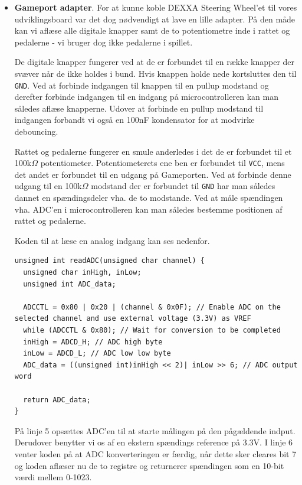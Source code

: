 \begin{itemize}
\item \textbf{Gameport adapter}. For at kunne koble DEXXA Steering Wheel'et til vores udviklingsboard var det dog nødvendigt at lave en lille adapter. På den måde kan vi aflæse alle digitale knapper samt de to potentiometre inde i rattet og pedalerne - vi bruger dog ikke pedalerne i spillet.

De digitale knapper fungerer ved at de er forbundet til en række knapper der svæver når de ikke holdes i bund. Hvis knappen holde nede kortsluttes den til \texttt{GND}. Ved at forbinde indgangen til knappen til en pullup modstand og derefter forbinde indgangen til en indgang på microcontrolleren kan man således aflæse knapperne. Udover at forbinde en pullup modstand til indgangen forbandt vi også en 100nF kondensator for at modvirke debouncing.

Rattet og pedalerne fungerer en smule anderledes i det de er forbundet til et 100k$\Omega$ potentiometer. Potentiometerets ene ben er forbundet til \texttt{VCC}, mens det andet er forbundet til en udgang på Gameporten. Ved at forbinde denne udgang til en 100k$\Omega$ modstand der er forbundet til \texttt{GND} har man således dannet en spændingsdeler vha. de to modstande. Ved at måle spændingen vha. ADC'en i microcontrolleren kan man således bestemme positionen af rattet og pedalerne.

Koden til at læse en analog indgang kan ses nedenfor.

\begin{lstlisting}
unsigned int readADC(unsigned char channel) {
  unsigned char inHigh, inLow;
  unsigned int ADC_data;
  
  ADCCTL = 0x80 | 0x20 | (channel & 0x0F); // Enable ADC on the selected channel and use external voltage (3.3V) as VREF
  while (ADCCTL & 0x80); // Wait for conversion to be completed
  inHigh = ADCD_H; // ADC high byte
  inLow = ADCD_L; // ADC low low byte
  ADC_data = ((unsigned int)inHigh << 2)| inLow >> 6; // ADC output word
  
  return ADC_data;
}
\end{lstlisting}

På linje 5 opsættes ADC'en til at starte målingen på den pågældende indput. Derudover benytter vi os af en ekstern spændings reference på 3.3V. I linje 6 venter koden på at ADC konverteringen er færdig, når dette sker cleares bit 7 og koden aflæser nu de to registre og returnerer spændingen som en 10-bit værdi mellem 0-1023.


\end{itemize}
